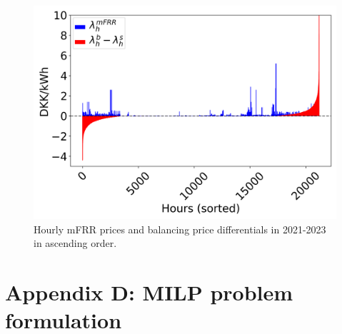 \documentclass[conference]{IEEEtran}
\begin{document}
{\begin{figure}[t]
    \centering
    \includegraphics[width=\columnwidth]{../figures/mfrr_prices.png}
    \caption{Hourly mFRR prices and balancing price differentials in 2021-2023 in ascending order.}
    \label{fig:mfrr_prices_2022}
\end{figure}

\section*{Appendix D: MILP problem formulation}\label{appendix:D}







}
\end{document}
